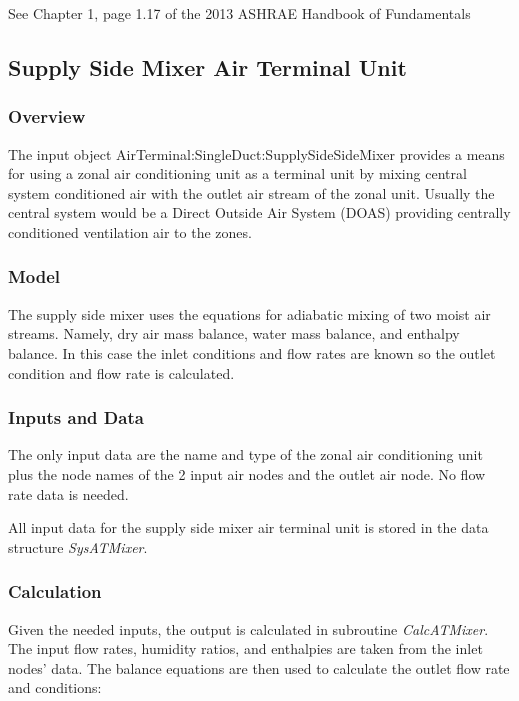 See Chapter 1, page 1.17 of the 2013 ASHRAE Handbook of Fundamentals

\subsection{Supply Side Mixer Air Terminal Unit}\label{supply-side-mixer-air-terminal-unit}

\subsubsection{Overview}\label{overview-2-007}

The input object AirTerminal:SingleDuct:SupplySideSideMixer provides a means for using a zonal air conditioning unit as a terminal unit by mixing central system conditioned air with the outlet air stream of the zonal unit. Usually the central system would be a Direct Outside Air System (DOAS) providing centrally conditioned ventilation air to the zones.

\subsubsection{Model}\label{model-2-000}

The supply side mixer uses the equations for adiabatic mixing of two moist air streams. Namely, dry air mass balance, water mass balance, and enthalpy balance. In this case the inlet conditions and flow rates are known so the outlet condition and flow rate is calculated.

\subsubsection{Inputs and Data}\label{inputs-and-data-2-000}

The only input data are the name and type of the zonal air conditioning unit plus the node names of the 2 input air nodes and the outlet air node. No flow rate data is needed.

All input data for the supply side mixer air terminal unit is stored in the data structure \emph{SysATMixer}.

\subsubsection{Calculation}\label{calculation-2-000}

Given the needed inputs, the output is calculated in subroutine \emph{CalcATMixer}. The input flow rates, humidity ratios, and enthalpies are taken from the inlet nodes' data. The balance equations are then used to calculate the outlet flow rate and conditions:

